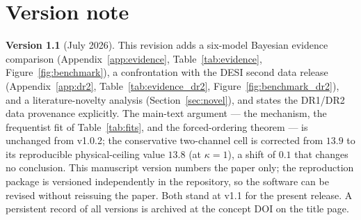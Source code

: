 \documentclass[11pt,a4paper]{article}
\begin{document}
\FloatBarrier
\section*{Version note}
\textbf{Version 1.1} (July 2026). This revision adds a six-model Bayesian evidence comparison (Appendix~\ref{app:evidence}, Table~\ref{tab:evidence}, Figure~\ref{fig:benchmark}), a confrontation with the DESI second data release (Appendix~\ref{app:dr2}, Table~\ref{tab:evidence_dr2}, Figure~\ref{fig:benchmark_dr2}), and a literature-novelty analysis (Section~\ref{sec:novel}), and states the DR1/DR2 data provenance explicitly. The main-text argument --- the mechanism, the frequentist fit of Table~\ref{tab:fits}, and the forced-ordering theorem --- is unchanged from v1.0.2; the conservative two-channel cell is corrected from $13.9$ to its reproducible physical-ceiling value $13.8$ (at $\kappa=1$), a shift of $0.1$ that changes no conclusion. This manuscript version numbers the paper only; the reproduction package is versioned independently in the repository, so the software can be revised without reissuing the paper. Both stand at v1.1 for the present release. A persistent record of all versions is archived at the concept DOI on the title page.



\end{document}
